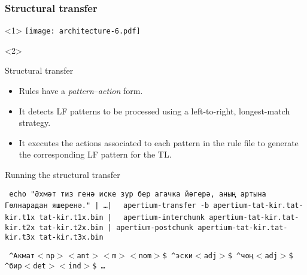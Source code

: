 \documentclass[10pt,xetex]{beamer} %
\begin{document}
\begin{frame}
  \frametitle{Structural transfer} %


\begin{onlyenv}<1>
\texttt{[image: architecture-6.pdf]}
\end{onlyenv}
\begin{onlyenv}<2>

  \begin{block}{Structural transfer}
 \begin{itemize}
 \item Rules have a \emph{pattern}--\emph{action} form.
 \item It detects LF patterns to be processed using a left-to-right, longest-match strategy.
 \item It executes the actions associated to each pattern in the rule file to generate the corresponding LF pattern for the TL.
 \end{itemize}
  \end{block}
  \begin{block}{Running the structural transfer}
  \begin{small}
  \texttt{ echo "Әхмәт тиз генә иске зур бер агачка йөгерә, аның артына Гөлнарадан яшеренә."  | \ldots | }
  \texttt{ apertium-transfer -b apertium-tat-kir.tat-kir.t1x tat-kir.t1x.bin | }
  \texttt{ apertium-interchunk apertium-tat-kir.tat-kir.t2x tat-kir.t2x.bin | apertium-postchunk apertium-tat-kir.tat-kir.t3x tat-kir.t3x.bin }
 
  \texttt{ \^{}Акмат$<$np$><$ant$><$m$><$nom$>$\$ \^{}эски$<$adj$>$\$ \^{}чоң$<$adj$>$\$ \^{}бир$<$det$><$ind$>$\$ \ldots }

  \end{small}
  \end{block}

\end{onlyenv}
\end{frame}
\end{document}
